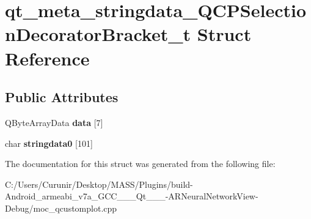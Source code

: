 \hypertarget{structqt__meta__stringdata___q_c_p_selection_decorator_bracket__t}{}\section{qt\+\_\+meta\+\_\+stringdata\+\_\+\+Q\+C\+P\+Selection\+Decorator\+Bracket\+\_\+t Struct Reference}
\label{structqt__meta__stringdata___q_c_p_selection_decorator_bracket__t}
\subsection*{Public Attributes}
\begin{DoxyCompactItemize}
\item 
\mbox{\label{structqt__meta__stringdata___q_c_p_selection_decorator_bracket__t_af56ea6e5b29d2f4b6a2ddcdec194731c}} 
Q\+Byte\+Array\+Data {\bfseries data} \mbox{[}7\mbox{]}
\item 
\mbox{\label{structqt__meta__stringdata___q_c_p_selection_decorator_bracket__t_aaa49e7799e2b58ec0d7f42c056d50830}} 
char {\bfseries stringdata0} \mbox{[}101\mbox{]}
\end{DoxyCompactItemize}


The documentation for this struct was generated from the following file\+:\begin{DoxyCompactItemize}
\item 
C\+:/\+Users/\+Curunir/\+Desktop/\+M\+A\+S\+S/\+Plugins/build-\/\+Android\+\_\+armeabi\+\_\+v7a\+\_\+\+G\+C\+C\+\_\+\_\+\_\+\+Qt\+\_\+\_\+\_-\/\+A\+R\+Neural\+Network\+View-\/\+Debug/moc\+\_\+qcustomplot.\+cpp\end{DoxyCompactItemize}
